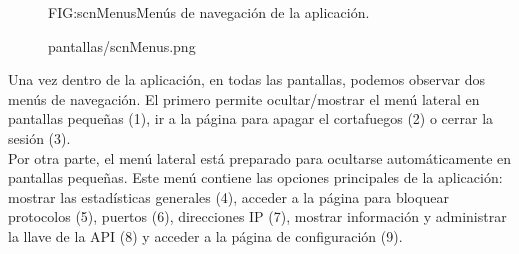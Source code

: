 \begin{figure}[Menús de navegación]{FIG:scnMenus}{Menús de navegación de la aplicación.}
  \begin{image}{}{}{pantallas/scnMenus.png}
  \end{image}
\end{figure}

Una vez dentro de la aplicación, en todas las pantallas, podemos observar dos menús de navegación. El primero permite ocultar/mostrar el menú lateral en pantallas pequeñas (1), ir a la página para apagar el cortafuegos (2) o cerrar la sesión (3).
\\Por otra parte, el menú lateral está preparado para ocultarse automáticamente en pantallas pequeñas. Este menú contiene las opciones principales de la aplicación: mostrar las estadísticas generales (4), acceder a la página para bloquear protocolos (5), puertos (6), direcciones IP (7), mostrar información y administrar la llave de la API (8) y acceder a la página de configuración (9).